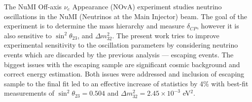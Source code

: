 
The NuMI Off-axis $\nu_e$ Appearance (NOvA) experiment studies neutrino oscillations 
in the NuMI (Neutrinos at the Main Injector) beam. The goal of the experiment is to determine 
the mass hierarchy and measure $\delta_{CP}$, however it is also sensitive to $\sin^2\theta_{23}$, and
$\Delta m_{32}^2$. The present work tries to improve experimental sensitivity to the oscillation
parameters by considering neutrino events which are discarded by the previous analysis --- escaping events.
The biggest issues with the escaping sample are significant cosmic background and correct
energy estimation. Both issues were addressed and inclusion of escaping sample to the final 
fit led to an effective increase of statistics by 4\% with best-fit measurements of 
$\sin^2\theta_{23} = 0.504$ and $\Delta m_{32}^2 = 2.45 \times 10^{-3}$ eV$^2$.

